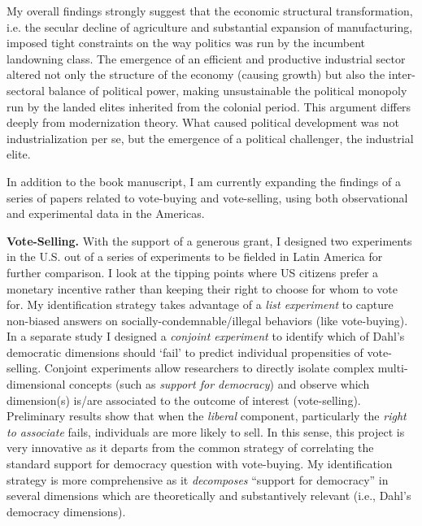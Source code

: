 \documentclass[10pt,stdletter,dateno,sigleft]{newlfm} %
\begin{document}
\begin{newlfm}
My overall findings strongly suggest that the economic structural transformation, i.e. the secular decline of agriculture and substantial expansion of manufacturing, imposed tight constraints on the way politics was run by the incumbent landowning class. The emergence of an efficient and productive industrial sector altered not only the structure of the economy (causing growth) but also the inter-sectoral balance of political power, making unsustainable the political monopoly run by the landed elites inherited from the colonial period. This argument differs deeply from modernization theory. What caused political development was not industrialization per se, but the emergence of a political challenger, the industrial elite.


In addition to the book manuscript, I am currently expanding the findings of a series of papers related to vote-buying and vote-selling, using both observational and experimental data in the Americas. 

{\bf Vote-Selling.} With the support of a generous grant, I designed two experiments in the U.S. out of a series of experiments to be fielded in Latin America for further comparison. I look at the tipping points where US citizens prefer a monetary incentive rather than keeping their right to choose for whom to vote for. My identification strategy takes advantage of a \emph{list experiment} to capture non-biased answers on socially-condemnable/illegal behaviors (like vote-buying). In a separate study I designed a \emph{conjoint experiment} to identify which of Dahl's democratic dimensions should `fail' to predict individual propensities of vote-selling. Conjoint experiments allow researchers to directly isolate complex multi-dimensional concepts (such as \emph{support for democracy}) and observe which dimension(s) is/are associated to the outcome of interest (vote-selling). Preliminary results show that when the \emph{liberal} component, particularly the \emph{right to associate} fails, individuals are more likely to sell. In this sense, this project is very innovative as it departs from the common strategy of correlating the standard support for democracy question with vote-buying. My identification strategy is more comprehensive as it \emph{decomposes} ``support for democracy'' in several dimensions which are theoretically and substantively relevant (i.e., Dahl's democracy dimensions). 


\end{newlfm}
\end{document}
